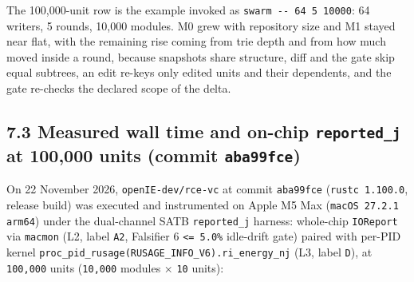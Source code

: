 \documentclass[10pt,letterpaper]{article}
\begin{document}
The 100,000-unit row is the example invoked as
\texttt{swarm\ -\allowbreak{}\/\allowbreak{}-\allowbreak{}\ 64\ 5\ 10000}: 64 writers, 5 rounds, 10,000
modules. M0 grew with repository size and M1 stayed near flat, with the
remaining rise coming from trie depth and from how much moved inside a
round, because snapshots share structure, diff and the gate skip equal
subtrees, an edit re-keys only edited units and their dependents, and
the gate re-checks the declared scope of the delta.

\subsection{\texorpdfstring{7.3 Measured wall time and on-chip
\texttt{reported\_j} at 100,000 units (commit
\texttt{aba99fce})}{7.3 Measured wall time and on-chip reported\_j at 100,000 units (commit aba99fce)}}\label{measured-wall-time-and-on-chip-reported_j-at-100000-units-commit-aba99fce}

On 22 November 2026, \texttt{openIE-\allowbreak{}dev/\allowbreak{}rce-\allowbreak{}vc} at commit
\texttt{aba99fce} (\texttt{rustc\ 1.100.0}, release build) was executed
and instrumented on Apple M5 Max (\texttt{macOS\ 27.2.1} \texttt{arm64})
under the dual-channel SATB \texttt{reported\_j} harness: whole-chip
\texttt{IOReport} via \texttt{macmon} (L2, label \texttt{A2}, Falsifier
6 \texttt{\textless{}=\ 5.0\%} idle-drift gate) paired with per-PID
kernel \texttt{proc\_\allowbreak{}pid\_\allowbreak{}rusage(\allowbreak{}RUSAGE\_\allowbreak{}INFO\_\allowbreak{}V6).\allowbreak{}ri\_\allowbreak{}energy\_\allowbreak{}nj} (L3,
label \texttt{D}), at \texttt{100,000} units (\texttt{10,000} modules ×
\texttt{10} units):
\end{document}
